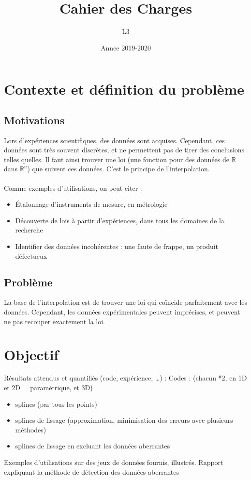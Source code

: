 \documentclass[a4paper,12pt]{article}
\title{Cahier des Charges}
\author{L3}
\date{Annee 2019-2020}
\newcommand{\IKex}[2]{\mathbb{#1}^{#2}}
\newcommand{\IK}[1]{\mathbb{#1}}
\newcommand{\IRex}[1]{\IKex{R}{#1}}
\newcommand{\IR}{\IK{R}}
\begin{document}
\maketitle
\tableofcontents

\newpage

\section{Contexte et définition du problème}

\subsection{Motivations}

Lors d'expériences scientifiques, des données sont acquises. Cependant, ces données sont très souvent discrètes, et ne permettent pas de tirer des conclusions telles quelles. Il faut ainsi trouver une loi (une fonction pour des données de $\IR$ dans $\IRex{n}$) que suivent ces données. C'est le principe de l'interpolation.
\\ \\
Comme exemples d'utilisations, on peut citer :
\begin{itemize}
\item Étalonnage d'instruments de mesure, en métrologie
\item Découverte de lois à partir d'expériences, dans tous les domaines de la recherche
\item Identifier des données incohérentes : une faute de frappe, un produit défectueux
\end{itemize}

\subsection{Problème}

La base de l'interpolation est de trouver une loi qui coïncide parfaitement avec les données. Cependant, les données expérimentales peuvent imprécises, et peuvent ne pas recouper exactement la loi. 

\newpage
\section{Objectif}

Résultats attendus et quantifiés (code, expérience, …) :
Codes : (chacun *2, en 1D et 2D = paramétrique, et 3D)
\begin{itemize}
\item splines (par tous les points)
\item splines de lissage (approximation, minimisation des erreurs avec plusieurs méthodes)
\item splines de lissage en excluant les données aberrantes
\end{itemize}
Exemples d’utilisations sur des jeux de données fournis, illustrés.
Rapport expliquant la méthode de détection des données aberrantes
\end{document}
